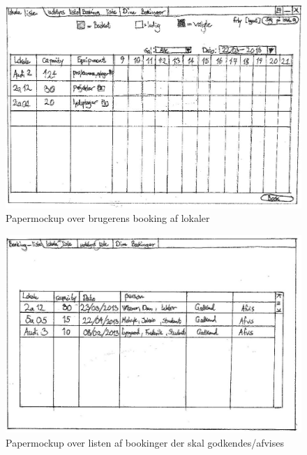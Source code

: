 \begin{figure}[h!]
  \centering
    \includegraphics[angle=90, height=0.9\textheight]{Appendix/GUI-Prototype/PaperMockup/LokaleListe_001}
  \caption{Papermockup over brugerens booking af lokaler}
\label{App_GUI_paper_LokaleListe}
\end{figure}

\begin{figure}[h!]
  \centering
    \includegraphics[angle=90, height=0.9\textheight]{Appendix/GUI-Prototype/PaperMockup/GodkendBookinger_001}
  \caption{Papermockup over listen af bookinger der skal godkendes/afvises}
\label{App_GUI_paper_GodkendBookinger}
\end{figure}

